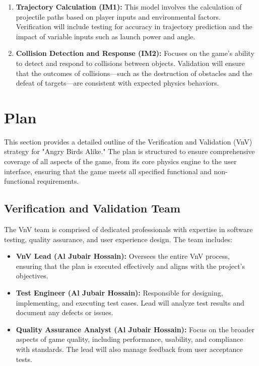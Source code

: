 \documentclass[12pt]{article}
\begin{document}
\begin{enumerate}
    \item \textbf{Trajectory Calculation (IM1):} This model involves the calculation of projectile paths based on player inputs and environmental factors. Verification will include testing for accuracy in trajectory prediction and the impact of variable inputs such as launch power and angle.
    \item \textbf{Collision Detection and Response (IM2):} Focuses on the game's ability to detect and respond to collisions between objects. Validation will ensure that the outcomes of collisions—such as the destruction of obstacles and the defeat of targets—are consistent with expected physics behaviors.
\end{enumerate}

\section{Plan}

This section provides a detailed outline of the Verification and Validation (VnV) strategy for "Angry Birds Alike." The plan is structured to ensure comprehensive coverage of all aspects of the game, from its core physics engine to the user interface, ensuring that the game meets all specified functional and non-functional requirements.

\subsection{Verification and Validation Team}
The VnV team is comprised of dedicated professionals with expertise in software testing, quality assurance, and user experience design. The team includes:

\begin{itemize}
    \item \textbf{VnV Lead (Al Jubair Hossain):} Oversees the entire VnV process, ensuring that the plan is executed effectively and aligns with the project's objectives.
    \item \textbf{Test Engineer (Al Jubair Hossain):} Responsible for designing, implementing, and executing test cases. Lead will analyze test results and document any defects or issues.
    \item \textbf{Quality Assurance Analyst (Al Jubair Hossain):} Focus on the broader aspects of game quality, including performance, usability, and compliance with standards. The lead will also manage feedback from user acceptance tests.
\end{itemize}
\end{document}

